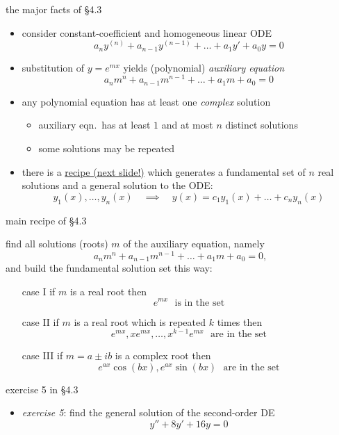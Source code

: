 \documentclass{beamer}
\begin{document}
\begin{frame}{the major facts of \S4.3}

\begin{itemize}
\item consider constant-coefficient and homogeneous linear ODE
    $$a_n y^{(n)} + a_{n-1} y^{(n-1)} + \dots + a_1 y' + a_0 y = 0$$
\item substitution of $y=e^{mx}$ yields (polynomial) \emph{auxiliary equation}
    $$a_n m^n + a_{n-1} m^{n-1} + \dots + a_1 m + a_0 = 0$$
\item any polynomial equation has at least one \emph{complex} solution
    \begin{itemize}
    \item auxiliary eqn.~has at least $1$ and at most $n$ distinct solutions
    \item some solutions may be repeated
    \end{itemize}
\item there is a \underline{recipe (next slide!)} which generates a fundamental set of $n$ real solutions and a general solution to the ODE:
    $$y_1(x),\dots,y_n(x) \quad \implies \quad y(x) = c_1 y_1(x) + \dots + c_n y_n(x)$$
\end{itemize}
\end{frame}


\begin{frame}{main recipe of \S4.3}

find all solutions (roots) $m$ of the auxiliary equation, namely
    $$a_n m^n + a_{n-1} m^{n-1} + \dots + a_1 m + a_0 = 0,$$
and build the fundamental solution set this way:
\begin{itemize}
\item[case I]   if $m$ is a real root then
    $$e^{mx} \,\, \text{ is in the set}$$
\item[case II]  if $m$ is a real root which is repeated $k$ times then
    $$e^{mx}, x e^{mx}, \dots, x^{k-1} e^{mx} \,\, \text{ are in the set}$$
\item[case III] if $m=a\pm i b$ is a complex root then
    $$e^{ax} \cos(bx), e^{ax} \sin(bx) \,\, \text{ are in the set}$$
\end{itemize}
\end{frame}


\begin{frame}{exercise 5 in \S4.3}

\begin{itemize}
\item \emph{exercise 5}:  find the general solution of the second-order DE
    $$y''+8y'+16y=0$$
\end{itemize}

\vspace{60mm}
\end{frame}
\end{document}
